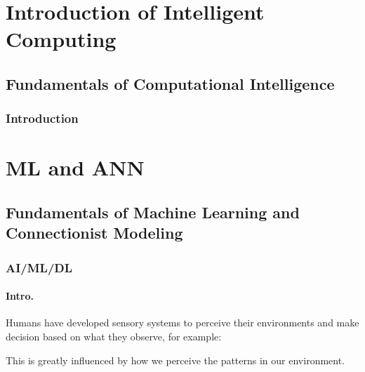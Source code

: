 \documentclass{tron}
\begin{document}
\chapter{Introduction of Intelligent Computing}
\section{Fundamentals of Computational Intelligence}
\subsection{Introduction}


\newpage
\chapter{\Gls{ML} and \Gls{ANN}}
\section{Fundamentals of Machine Learning and Connectionist Modeling}
\subsection{AI/ML/DL}
%
\subsubsection{Intro.}
Humans have developed sensory systems to perceive their environments and make decision based on what they observe, for example:

This is greatly influenced by how we perceive the patterns in our environment.

%
\end{document}
